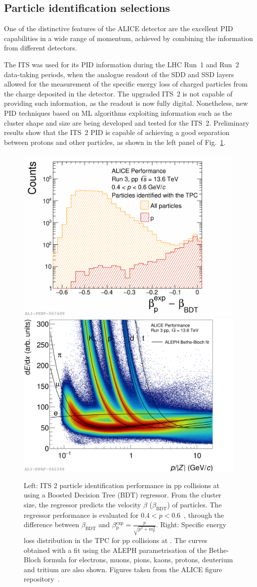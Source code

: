 \subsection{Particle identification selections}
One of the distinctive features of the ALICE detector are the excellent PID capabilities in a wide range of momentum, achieved by combining the information from different detectors. 

The ITS was used for its PID information during the LHC Run~1 and Run~2 data-taking periods, when the analogue readout of the SDD and SSD layers allowed for the measurement of the specific energy loss \dedx of charged particles from the charge deposited in the detector. The upgraded ITS~2 is not capable of providing such information, as the readout is now fully digital. Nonetheless, new PID techniques based on ML algorithms exploiting information such as the cluster shape and size are being developed and tested for the ITS~2. Preliminary results show that the ITS~2 PID is capable of achieving a good separation between protons and other particles, as shown in the left panel of Fig.~\ref{fig:ITSTPCPID}.

\begin{figure}[htb]
    \centering
    \includegraphics[width=0.48\linewidth]{Figures/Chapter 4/deltabetap-tpctagged.pdf}
    \includegraphics[width=0.48\linewidth]{Figures/Chapter 4/tpcdedx_1.png}
    \caption{Left: ITS 2 particle identification performance in pp collisions at \mbox{\thirteen} using a Boosted Decision Tree (BDT) regressor. From the cluster size, the regressor predicts the velocity $\beta$ ($\beta_\mathrm{BDT}$) of particles. The regressor performance is evaluated for $0.4 < p < 0.6$~\gevc, through the difference between $\beta_\mathrm{BDT}$ and $\beta\mathrm{_p^{exp}} = \frac{p}{\sqrt{p^2 + m_\mathrm{p}^2}}$. Right: Specific energy loss distribution \dedx in the TPC for pp collisions at \thirteen. The curves obtained with a fit using the ALEPH parametrisation of the Bethe-Bloch formula for electrons, muons, pions, kaons, protons, deuterium and tritium are also shown. Figures taken from the ALICE figure repository~\cite{ALICE_figures}.}
    \label{fig:ITSTPCPID}
\end{figure}

